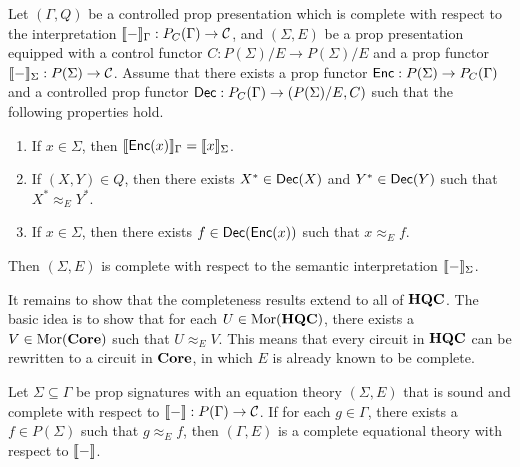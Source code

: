 \begin{theorem}
    \label{Thm:Completeness1}
    Let $( \Gamma, Q )$ be a controlled prop presentation which is complete with respect to the interpretation $\llbracket-\rrbracket_\Gamma: P_C( \Gamma ) \to \mathcal{C}$, and $( \Sigma, E )$ be a prop presentation equipped with a control functor $C: P( \Sigma ) / E \to P( \Sigma ) / E$ and a prop functor $\llbracket-\rrbracket_\Sigma: P( \Sigma ) \to \mathcal{C}$.
    Assume that there exists a prop functor $\mathsf{Enc}: P( \Sigma ) \to P_C( \Gamma )$ and a controlled prop functor $\mathsf{Dec}: P_C( \Gamma ) \to ( P( \Sigma ) / E, C )$ such that the following properties hold.
    \begin{enumerate}
    \item If $x \in \Sigma$, then $\llbracket\mathsf{Enc}(x)\rrbracket_\Gamma = \llbracket x\rrbracket_\Sigma$.
    \item If $( X, Y ) \in Q$, then there exists $X^* \in \mathsf{Dec}( X )$ and $Y^* \in \mathsf{Dec}( Y )$ such that $X^* \approx_E Y^*$.
    \item If $x \in \Sigma$, then there exists $f \in \mathsf{Dec}( \mathsf{Enc} ( x ) )$ such that $x \approx_E f$.
    \end{enumerate}
    Then $( \Sigma, E )$ is complete with respect to the semantic interpretation $\llbracket-\rrbracket_\Sigma$.
\end{theorem}

It remains to show that the completeness results extend to all of $\mathbf{HQC}$.
The basic idea is to show that for each $U \in \operatorname{Mor}( \mathbf{HQC} )$, there exists a $V \in \operatorname{Mor}( \mathbf{Core} )$ such that $U \approx_E V$.
This means that every circuit in $\mathbf{HQC}$ can be rewritten to a circuit in $\mathbf{Core}$, in which $E$ is already known to be complete.

\begin{theorem}
    \label{Thm:Completeness2}
    Let $\Sigma \subseteq \Gamma$ be prop signatures with an equation theory $( \Sigma, E )$ that is sound and complete with respect to $\llbracket-\rrbracket: P( \Gamma ) \to \mathcal{C}$.
    If for each $g \in \Gamma$, there exists a $f\in P( \Sigma )$ such that $g \approx_E f$, then $( \Gamma, E )$ is a complete equational theory with respect to $\llbracket-\rrbracket$.
\end{theorem}


